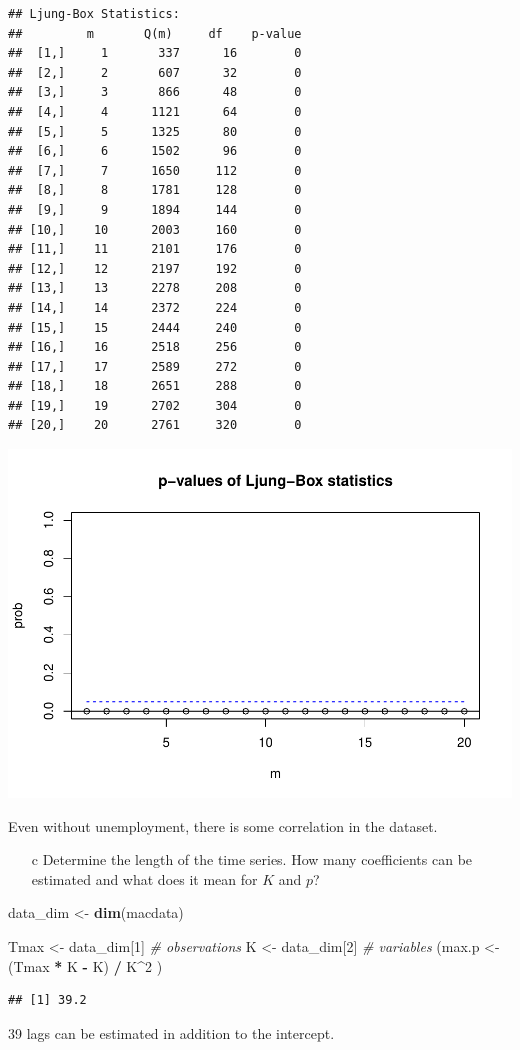 \documentclass[12pt,a4paper]{article}
\newenvironment{Shaded}{\begin{snugshade}}{\end{snugshade}}
\newcommand{\CommentTok}[1]{\textcolor[rgb]{0.56,0.35,0.01}{\textit{#1}}}
\newcommand{\DecValTok}[1]{\textcolor[rgb]{0.00,0.00,0.81}{#1}}
\newcommand{\KeywordTok}[1]{\textcolor[rgb]{0.13,0.29,0.53}{\textbf{#1}}}
\newcommand{\NormalTok}[1]{#1}
\newcommand{\OperatorTok}[1]{\textcolor[rgb]{0.81,0.36,0.00}{\textbf{#1}}}
\newcommand{\StringTok}[1]{\textcolor[rgb]{0.31,0.60,0.02}{#1}}
\begin{document}
\begin{verbatim}
## Ljung-Box Statistics:  
##         m       Q(m)     df    p-value
##  [1,]     1       337      16        0
##  [2,]     2       607      32        0
##  [3,]     3       866      48        0
##  [4,]     4      1121      64        0
##  [5,]     5      1325      80        0
##  [6,]     6      1502      96        0
##  [7,]     7      1650     112        0
##  [8,]     8      1781     128        0
##  [9,]     9      1894     144        0
## [10,]    10      2003     160        0
## [11,]    11      2101     176        0
## [12,]    12      2197     192        0
## [13,]    13      2278     208        0
## [14,]    14      2372     224        0
## [15,]    15      2444     240        0
## [16,]    16      2518     256        0
## [17,]    17      2589     272        0
## [18,]    18      2651     288        0
## [19,]    19      2702     304        0
## [20,]    20      2761     320        0
\end{verbatim}

\includegraphics{solution_exercise_5_files/figure-latex/unnamed-chunk-6-1.pdf}

Even without unemployment, there is some correlation in the dataset.

\begin{itemize}
  \item[c] Determine the length of the time series. How many coefficients can be estimated and what does it mean for $K$ and $p$?
\end{itemize}

\begin{Shaded}
\begin{Highlighting}[]
\NormalTok{data_dim <-}\StringTok{ }\KeywordTok{dim}\NormalTok{(macdata) }

\NormalTok{Tmax <-}\StringTok{ }\NormalTok{data_dim[}\DecValTok{1}\NormalTok{] }\CommentTok{# observations}
\NormalTok{K <-}\StringTok{ }\NormalTok{data_dim[}\DecValTok{2}\NormalTok{] }\CommentTok{# variables}
\NormalTok{(max.p <-}\StringTok{ }\NormalTok{(Tmax }\OperatorTok{*}\StringTok{ }\NormalTok{K }\OperatorTok{-}\StringTok{ }\NormalTok{K) }\OperatorTok{/}\StringTok{ }\NormalTok{K}\OperatorTok{^}\DecValTok{2}\NormalTok{ )}
\end{Highlighting}
\end{Shaded}

\begin{verbatim}
## [1] 39.2
\end{verbatim}

39 lags can be estimated in addition to the intercept.
\end{document}
